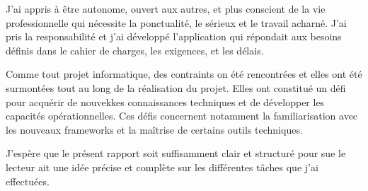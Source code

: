 J'ai appris à être autonome, ouvert aux autres, et plus conscient de la vie professionnelle qui nécessite la ponctualité, le sérieux et le travail acharné. J'ai pris la responsabilité et j'ai développé l'application qui répondait aux besoins définis dans le cahier de charges, les exigences, et les délais.

Comme tout projet informatique, des contraints on été rencontrées et elles ont été surmontées tout au long de la réalisation du projet. Elles ont constitué un défi pour acquérir de nouvekkes connaissances techniques et de développer les capacités opérationnelles. Ces défis concernent notamment la familiarisation avec les nouveaux frameworks et la maîtrise de certains outils techniques.

J'espère que le présent rapport soit suffisamment clair et structuré pour sue le lecteur ait une idée précise et complète sur les différentes tâches que j'ai effectuées.

